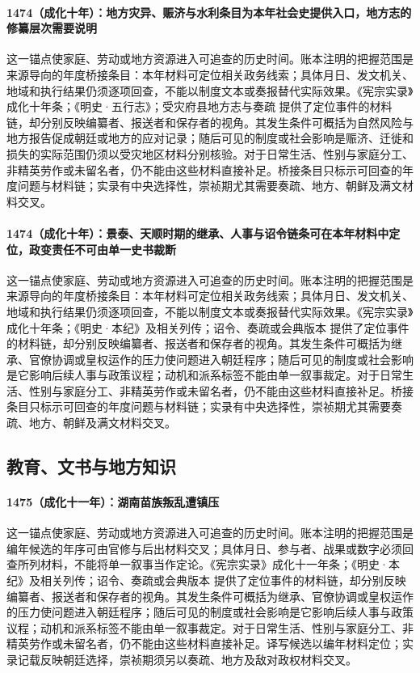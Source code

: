 \paragraph{1474（成化十年）：地方灾异、赈济与水利条目为本年社会史提供入口，地方志的修纂层次需要说明} 这一锚点使家庭、劳动或地方资源进入可追查的历史时间。账本注明的把握范围是来源导向的年度桥接条目：本年材料可定位相关政务线索；具体月日、发文机关、地域和执行结果仍须逐项回查，不能以制度文本或奏报替代实际效果。《宪宗实录》成化十年条；《明史·五行志》；受灾府县地方志与奏疏 提供了定位事件的材料链，却分别反映编纂者、报送者和保存者的视角。其发生条件可概括为自然风险与地方报告促成朝廷或地方的应对记录；随后可见的制度或社会影响是赈济、迁徙和损失的实际范围仍须以受灾地区材料分别核验。对于日常生活、性别与家庭分工、非精英劳作或未留名者，仍不能由这些材料直接补足。桥接条目只标示可回查的年度问题与材料链；实录有中央选择性，崇祯期尤其需要奏疏、地方、朝鲜及满文材料交叉。

\paragraph{1474（成化十年）：景泰、天顺时期的继承、人事与诏令链条可在本年材料中定位，政变责任不可由单一史书裁断} 这一锚点使家庭、劳动或地方资源进入可追查的历史时间。账本注明的把握范围是来源导向的年度桥接条目：本年材料可定位相关政务线索；具体月日、发文机关、地域和执行结果仍须逐项回查，不能以制度文本或奏报替代实际效果。《宪宗实录》成化十年条；《明史·本纪》及相关列传；诏令、奏疏或会典版本 提供了定位事件的材料链，却分别反映编纂者、报送者和保存者的视角。其发生条件可概括为继承、官僚协调或皇权运作的压力使问题进入朝廷程序；随后可见的制度或社会影响是它影响后续人事与政策议程；动机和派系标签不能由单一叙事裁定。对于日常生活、性别与家庭分工、非精英劳作或未留名者，仍不能由这些材料直接补足。桥接条目只标示可回查的年度问题与材料链；实录有中央选择性，崇祯期尤其需要奏疏、地方、朝鲜及满文材料交叉。

\subsection{教育、文书与地方知识}

\paragraph{1475（成化十一年）：湖南苗族叛乱遭镇压} 这一锚点使家庭、劳动或地方资源进入可追查的历史时间。账本注明的把握范围是编年候选的年序可由官修与后出材料交叉；具体月日、参与者、战果或数字必须回查所列材料，不能将单一叙事当作定论。《宪宗实录》成化十一年条；《明史·本纪》及相关列传；诏令、奏疏或会典版本 提供了定位事件的材料链，却分别反映编纂者、报送者和保存者的视角。其发生条件可概括为继承、官僚协调或皇权运作的压力使问题进入朝廷程序；随后可见的制度或社会影响是它影响后续人事与政策议程；动机和派系标签不能由单一叙事裁定。对于日常生活、性别与家庭分工、非精英劳作或未留名者，仍不能由这些材料直接补足。译写候选以编年材料定位；实录记载反映朝廷选择，崇祯期须另以奏疏、地方及敌对政权材料交叉。

